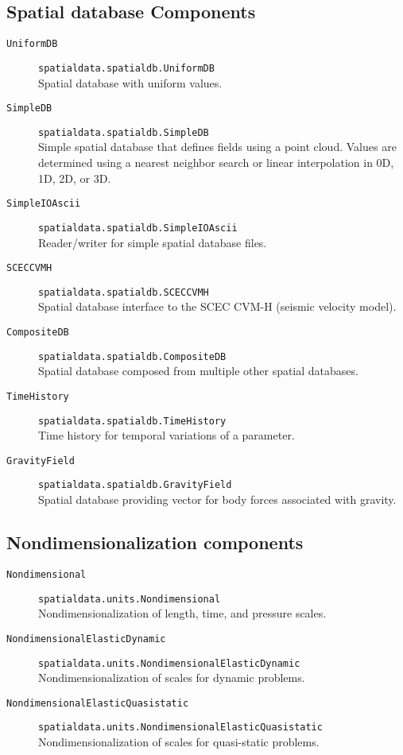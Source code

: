 \subsection{Spatial database Components}
\begin{description}
\item [{\texttt{UniformDB}}] \texttt{spatialdata.spatialdb.UniformDB}\\
Spatial database with uniform values.
\item [{\texttt{SimpleDB}}] \texttt{spatialdata.spatialdb.SimpleDB}\\
Simple spatial database that defines fields using a point cloud. Values
are determined using a nearest neighbor search or linear interpolation
in 0D, 1D, 2D, or 3D.
\item [{\texttt{SimpleIOAscii}}] \texttt{spatialdata.spatialdb.SimpleIOAscii}\\
Reader/writer for simple spatial database files.
\item [{\texttt{SCECCVMH}}] \texttt{spatialdata.spatialdb.SCECCVMH}\\
Spatial database interface to the SCEC CVM-H (seismic velocity model).
\item [{\texttt{CompositeDB}}] \texttt{spatialdata.spatialdb.CompositeDB}\\
Spatial database composed from multiple other spatial databases.
\item [{\texttt{TimeHistory}}] \texttt{spatialdata.spatialdb.TimeHistory}\\
Time history for temporal variations of a parameter.
\item [{\texttt{GravityField}}] \texttt{spatialdata.spatialdb.GravityField}\\
Spatial database providing vector for body forces associated with
gravity.
\end{description}

\subsection{Nondimensionalization components}
\begin{description}
\item [{\texttt{Nondimensional}}] \texttt{spatialdata.units.Nondimensional}\\
Nondimensionalization of length, time, and pressure scales.
\item [{\texttt{NondimensionalElasticDynamic}}] \texttt{spatialdata.units.NondimensionalElasticDynamic}\\
Nondimensionalization of scales for dynamic problems.
\item [{\texttt{NondimensionalElasticQuasistatic}}] \texttt{spatialdata.units.NondimensionalElasticQuasistatic}\\
Nondimensionalization of scales for quasi-static problems.\end{description}

